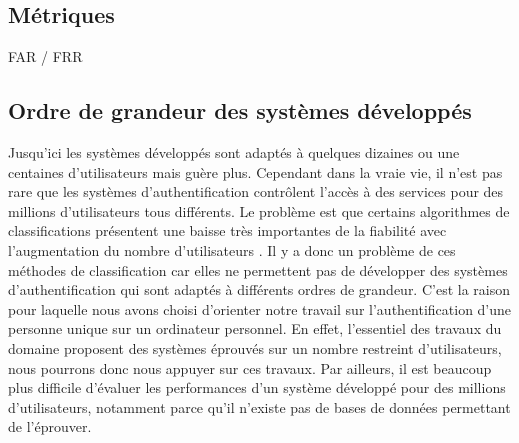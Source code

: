 \subsection{Métriques}
FAR / FRR

\subsection{Ordre de grandeur des systèmes développés}

Jusqu'ici les systèmes développés sont adaptés à quelques dizaines ou une centaines d'utilisateurs mais guère plus. Cependant dans la vraie vie, il n'est pas rare que les systèmes d'authentification contrôlent l'accès à des services pour des millions d'utilisateurs tous différents. Le problème est que certains algorithmes de classifications présentent une baisse très importantes de la fiabilité avec l'augmentation du nombre d'utilisateurs \cite{panasiuk2016}. Il y a donc un problème de ces méthodes de classification car elles ne permettent pas de développer des systèmes d'authentification qui sont adaptés à différents ordres de grandeur. C'est la raison pour laquelle nous avons choisi d'orienter notre travail sur l'authentification d'une personne unique sur un ordinateur personnel. En effet, l'essentiel des travaux du domaine proposent des systèmes éprouvés sur un nombre restreint d'utilisateurs, nous pourrons donc nous appuyer sur ces travaux. Par ailleurs, il est beaucoup plus difficile d'évaluer les performances d'un système développé pour des millions d'utilisateurs, notamment parce qu'il n'existe pas de bases de données permettant de l'éprouver.
